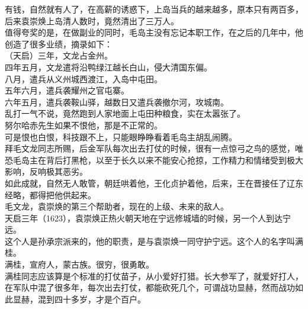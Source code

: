 \begin{multicols}{\theparacolNo}
有钱，自然就有人了，在高薪的诱惑下，上岛当兵的越来越多，原本只有两百多，后来袁崇焕上岛清人数时，竟然清出了三万人。\\

值得夸奖的是，在做副业的同时，毛岛主没有忘记本职工作，在之后的几年中，他创造了很多业绩，摘录如下：\\

（天启）三年，文龙占金州。\\

四年五月，文龙遣将沿鸭绿江越长白山，侵大清国东偏。\\

八月，遣兵从义州城西渡江，入岛中屯田。\\

五年六月，遣兵袭耀州之官屯寨。\\

六年五月，遣兵袭鞍山驿，越数日又遣兵袭撤尔河，攻城南。\\

乱打一气不说，竟然跑到人家地面上屯田种粮食，实在太嚣张了。\\

努尔哈赤先生如果不恨他，那是不正常的。\\

可是恨也白恨，科技跟不上，只能眼睁睁看着毛岛主胡乱闹腾。\\

拜毛文龙同志所赐，后金军队每次出去打仗的时候，很有一点惊弓之鸟的感觉，唯恐毛岛主在背后打黑枪，以至于长久以来不能安心抢掠，工作精力和情绪受到极大影响，反响极其恶劣。\\

如此成就，自然无人敢管，朝廷哄着他，王化贞护着他，后来，王在晋接任了辽东经略，都得把他供起来。\\

毛文龙，袁崇焕的第三个帮助者，现在的上级、未来的敌人。\\

天启三年（1623），袁崇焕正热火朝天地在宁远修城墙的时候，另一个人到达宁远。\\

这个人是孙承宗派来的，他的职责，是与袁崇焕一同守护宁远。这个人的名字叫满桂。\\

满桂，宣府人，蒙古族。很穷，很勇敢。\\

满桂同志应该算是个标准的打仗苗子，从小爱好打猎。长大参军了，就爱好打人，在军队中混了很多年，每次出去打仗，都能砍死几个，可谓战功显赫，然而战功如此显赫，混到四十多岁，才是个百户。\\


\end{multicols}
